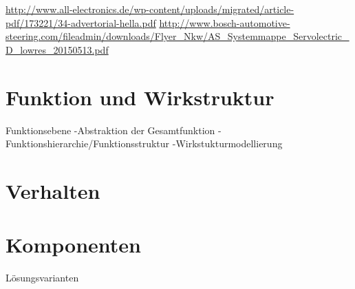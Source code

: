 \url{http://www.all-electronics.de/wp-content/uploads/migrated/article-pdf/173221/34-advertorial-hella.pdf} %
\url{http://www.bosch-automotive-steering.com/fileadmin/downloads/Flyer_Nkw/AS_Systemmappe_Servolectric_D_lowres_20150513.pdf} %



\section{Funktion und Wirkstruktur}
\label{cha:Wirkstuktur}
Funktionsebene
-Abstraktion der Gesamtfunktion
-Funktionshierarchie/Funktionsstruktur
-Wirkstukturmodellierung



\section{Verhalten}
\label{cha:Verhalten}



\section{Komponenten}
\label{cha:Komponenten}







Lösungsvarianten



